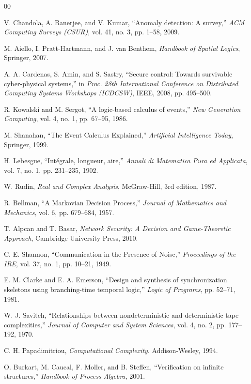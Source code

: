 \documentclass[conference]{IEEEtran}
\begin{document}
\begin{thebibliography}{00}

 V. Chandola, A. Banerjee, and V. Kumar, ``Anomaly detection: A survey,'' \textit{ACM Computing Surveys (CSUR)}, vol. 41, no. 3, pp. 1--58, 2009.

 M. Aiello, I. Pratt-Hartmann, and J. van Benthem, \textit{Handbook of Spatial Logics}, Springer, 2007.

 A. A. Cardenas, S. Amin, and S. Sastry, ``Secure control: Towards survivable cyber-physical systems,'' in \textit{Proc. 28th International Conference on Distributed Computing Systems Workshops (ICDCSW)}, IEEE, 2008, pp. 495--500.

 R. Kowalski and M. Sergot, ``A logic-based calculus of events,'' \textit{New Generation Computing}, vol. 4, no. 1, pp. 67--95, 1986.

 M. Shanahan, ``The Event Calculus Explained,'' \textit{Artificial Intelligence Today}, Springer, 1999.

 H. Lebesgue, ``Int\'{e}grale, longueur, aire,'' \textit{Annali di Matematica Pura ed Applicata}, vol. 7, no. 1, pp. 231--235, 1902.

 W. Rudin, \textit{Real and Complex Analysis}, McGraw-Hill, 3rd edition, 1987.

 R. Bellman, ``A Markovian Decision Process,'' \textit{Journal of Mathematics and Mechanics}, vol. 6, pp. 679--684, 1957.

 T. Alpcan and T. Basar, \textit{Network Security: A Decision and Game-Theoretic Approach}, Cambridge University Press, 2010.

 C. E. Shannon, ``Communication in the Presence of Noise,'' \textit{Proceedings of the IRE}, vol. 37, no. 1, pp. 10--21, 1949.

 E. M. Clarke and E. A. Emerson, ``Design and synthesis of synchronization skeletons using branching-time temporal logic,'' \textit{Logic of Programs}, pp. 52--71, 1981.

 W. J. Savitch, ``Relationships between nondeterministic and deterministic tape complexities,'' \textit{Journal of Computer and System Sciences}, vol. 4, no. 2, pp. 177--192, 1970.

 C. H. Papadimitriou, \textit{Computational Complexity}. Addison-Wesley, 1994.

 O. Burkart, M. Caucal, F. Moller, and B. Steffen, ``Verification on infinite structures,'' \textit{Handbook of Process Algebra}, 2001.


\end{thebibliography}
\end{document}
